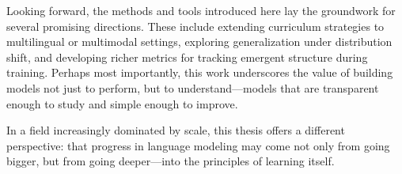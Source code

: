 Looking forward, the methods and tools introduced here lay the groundwork for several promising directions. These include extending curriculum strategies to multilingual or multimodal settings, exploring generalization under distribution shift, and developing richer metrics for tracking emergent structure during training. Perhaps most importantly, this work underscores the value of building models not just to perform, but to understand—models that are transparent enough to study and simple enough to improve.

In a field increasingly dominated by scale, this thesis offers a different perspective: that progress in language modeling may come not only from going bigger, but from going deeper—into the principles of learning itself.